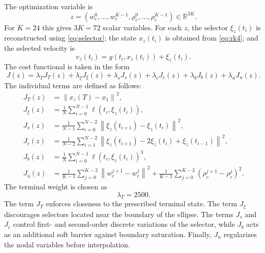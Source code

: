 \documentclass[11pt]{article}
\theoremstyle{definition}
\theoremstyle{remark}
\newcommand{\R}{\mathbb{R}}
\newcommand{\norm}[1]{\left\lVert #1\right\rVert}
\begin{document}
The optimization variable is
\begin{equation}
    z=\left(w_c^0,\ldots,w_c^{K-1},\rho_c^0,\ldots,\rho_c^{K-1}\right)\in\R^{3K}.
    \label{eq:optimization-variable}
\end{equation}
For $K=24$ this gives $3K=72$ scalar variables. For each $z$, the selector $\xi_z(t_i)$ is reconstructed using \eqref{eq:selector}; the state $x_z(t_i)$ is obtained from \eqref{eq:rk4}; and the selected velocity is
\begin{equation}
    v_z(t_i)=g(t_i,x_z(t_i))+\xi_z(t_i).
\end{equation}
The cost functional is taken in the form
\begin{equation}
    J(z)=\lambda_TJ_T(z)+\lambda_{\xi}J_{\xi}(z)+\lambda_sJ_s(z)
    +\lambda_cJ_c(z)+\lambda_bJ_b(z)+\lambda_uJ_u(z).
    \label{eq:general-cost}
\end{equation}
The individual terms are defined as follows:
\begin{align}
    J_T(z)&=\norm{x_z(T)-x_1}^2,\label{eq:terminal-cost}\\
    J_{\xi}(z)&=\frac{1}{N}\sum_{i=0}^{N-1}\ell(t_i,\xi_z(t_i)),\label{eq:selector-energy}\\
    J_s(z)&=\frac{1}{N-1}\sum_{i=0}^{N-2}\norm{\xi_z(t_{i+1})-\xi_z(t_i)}^2,\label{eq:smoothness-cost}\\
    J_c(z)&=\frac{1}{N-2}\sum_{i=1}^{N-2}
    \norm{\xi_z(t_{i+1})-2\xi_z(t_i)+\xi_z(t_{i-1})}^2,\label{eq:curvature-cost}\\
    J_b(z)&=\frac{1}{N}\sum_{i=0}^{N-1}\ell(t_i,\xi_z(t_i))^3,\label{eq:boundary-cost}\\
    J_u(z)&=\frac{1}{K-1}\sum_{j=0}^{K-2}\norm{w_c^{j+1}-w_c^j}^2
    +\frac{1}{K-1}\sum_{j=0}^{K-2}(\rho_c^{j+1}-\rho_c^j)^2.
    \label{eq:node-smoothness}
\end{align}
The terminal weight is chosen as
\begin{equation}
    \lambda_T=2500.
\end{equation}
The term $J_T$ enforces closeness to the prescribed terminal state. The term $J_{\xi}$ discourages selectors located near the boundary of the ellipse. The terms $J_s$ and $J_c$ control first- and second-order discrete variations of the selector, while $J_b$ acts as an additional soft barrier against boundary saturation. Finally, $J_u$ regularizes the nodal variables before interpolation.
\end{document}
